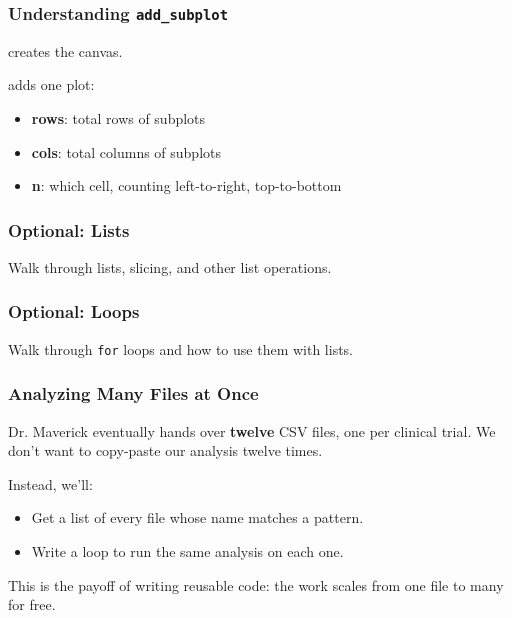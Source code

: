 \documentclass{beamer}
\begin{document}
\begin{frame}[fragile]
    \frametitle{Understanding \texttt{add\_subplot}}
     creates the canvas.

    \bigskip

     adds one plot:
    \begin{itemize}
        \item \textbf{rows}: total rows of subplots
        \item \textbf{cols}: total columns of subplots
        \item \textbf{n}: which cell, counting left-to-right, top-to-bottom
    \end{itemize}
\end{frame}

\begin{frame}
    \frametitle{Optional: Lists}
    Walk through lists, slicing, and other list operations.
\end{frame}

\begin{frame}
    \frametitle{Optional: Loops}
    Walk through \texttt{for} loops and how to use them with lists.
\end{frame}

\begin{frame}[fragile]
    \frametitle{Analyzing Many Files at Once}
    Dr. Maverick eventually hands over \textbf{twelve} CSV files, one per
    clinical trial. We don't want to copy-paste our analysis twelve times.

    \bigskip

    Instead, we'll:
    \begin{itemize}
        \item Get a list of every file whose name matches a pattern.
        \item Write a  loop to run the same analysis on each one.
    \end{itemize}

    \bigskip

    This is the payoff of writing reusable code: the work scales from one
    file to many for free.
\end{frame}
\end{document}
